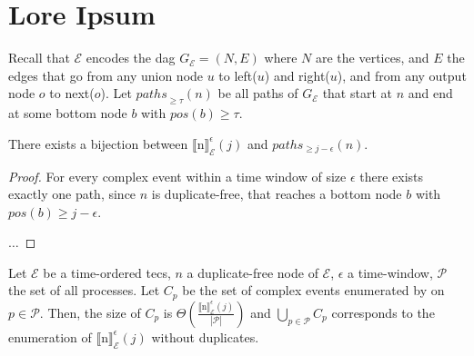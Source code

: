\chapter{Lore Ipsum}\label{chapter:}

\begin{definition}\label{definition:paths}
Recall that $\mathcal{E}$ encodes the \acrshort{dag} $G_{\mathcal{E}} = (N, E)$ where $N$ are the vertices, and $E$ the edges that go from any union node $u$ to left($u$) and right($u$), and from any output node $o$ to next($o$). Let ${paths}_{\ge \tau}(n)$ be all paths of $G_{\mathcal{E}}$ that start at $n$ and end at some bottom node $b$ with $pos(b) \ge \tau$.
\end{definition}

\begin{theorem}\label{theorem:bijection_paths}
There exists a bijection between ${\llbracket \text{n} \rrbracket}^{\epsilon}_{\mathcal{E}}(j)$ and $paths_{\ge j - \epsilon}(n)$.
\end{theorem}

\begin{proof}
For every complex event within a time window of size $\epsilon$ there exists exactly one path, since $n$ is duplicate-free, that reaches a bottom node $b$ with $pos(b) \ge j - \epsilon$.

$\ldots$
\end{proof}


\begin{theorem}\label{theorem:enumeration}
Let $\mathcal{E}$ be a time-ordered \acrshort{tecs}, $n$ a duplicate-free node of $\mathcal{E}$, $\epsilon$ a time-window, $\mathcal{P}$ the set of all processes. Let $C_{p}$ be the set of complex events enumerated by  on $p \in \mathcal{P}$. Then, the size of $C_{p}$ is $\Theta(\frac{{\llbracket \text{n} \rrbracket}^{\epsilon}_{\mathcal{E}}(j)}{|\mathcal{P}|})$ and $\bigcup\limits_{p \in \mathcal{P}} C_{p}$ corresponds to the enumeration of ${\llbracket \text{n} \rrbracket}^{\epsilon}_{\mathcal{E}}(j)$ without duplicates.
\end{theorem}

